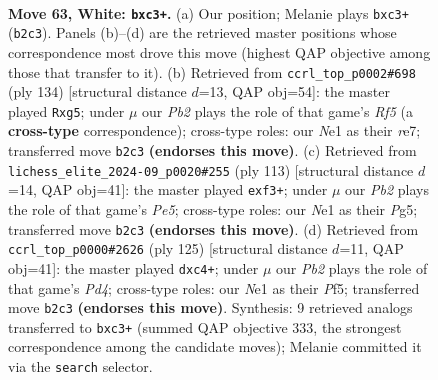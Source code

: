 \documentclass[11pt]{article}
\begin{document}
\clearpage

\begin{figure}[p]\centering
\begin{subfigure}{0.46\textwidth}\centering
\resizebox{\linewidth}{!}{%
\newchessgame
\chessboard[
  setfen={8/8/7R/7P/3k4/2p5/1P3K2/4N3 w - - 0 63},
  showmover=false,
  pgfstyle=straightmove, color=movearrow, markmove={b2-c3}
]}
\caption{}
\end{subfigure}\hfill
\begin{subfigure}{0.46\textwidth}\centering
\resizebox{\linewidth}{!}{%
\newchessgame
\chessboard[
  setfen={8/4r3/7k/5Rp1/3K1P2/8/8/8 w - - 0 68},
  showmover=false,
  pgfstyle=straightmove, color=movearrow, markmove={f5-g5}
]}
\caption{}
\end{subfigure}
\\[4pt]
\begin{subfigure}{0.46\textwidth}\centering
\resizebox{\linewidth}{!}{%
\newchessgame
\chessboard[
  setfen={8/1R6/5p2/6pk/4p3/5P2/6K1/8 b - - 0 57},
  showmover=false,
  pgfstyle=straightmove, color=movearrow, markmove={e4-f3}
]}
\caption{}
\end{subfigure}\hfill
\begin{subfigure}{0.46\textwidth}\centering
\resizebox{\linewidth}{!}{%
\newchessgame
\chessboard[
  setfen={r7/8/6k1/3p1p2/2PP4/1K6/8/7R b - - 2 63},
  showmover=false,
  pgfstyle=straightmove, color=movearrow, markmove={d5-c4}
]}
\caption{}
\end{subfigure}
\caption{\textbf{Move 63, White: \texttt{bxc3+}.} (a) Our position; Melanie plays \texttt{bxc3+} (\texttt{b2c3}). Panels (b)--(d) are the retrieved master positions whose correspondence most drove this move (highest QAP objective among those that transfer to it). (b) Retrieved from \texttt{ccrl\_top\_p0002\#698} (ply 134) [structural distance $d$=13, QAP obj=54]: the master played \texttt{Rxg5}; under $\mu$ our \emph{Pb2} plays the role of that game's \emph{Rf5} (a \textbf{cross-type} correspondence); cross-type roles: our \emph{N}e1 as their \emph{r}e7; transferred move \texttt{b2c3} \textbf{(endorses this move)}. (c) Retrieved from \texttt{lichess\_elite\_2024-09\_p0020\#255} (ply 113) [structural distance $d$=14, QAP obj=41]: the master played \texttt{exf3+}; under $\mu$ our \emph{Pb2} plays the role of that game's \emph{Pe5}; cross-type roles: our \emph{N}e1 as their \emph{P}g5; transferred move \texttt{b2c3} \textbf{(endorses this move)}. (d) Retrieved from \texttt{ccrl\_top\_p0000\#2626} (ply 125) [structural distance $d$=11, QAP obj=41]: the master played \texttt{dxc4+}; under $\mu$ our \emph{Pb2} plays the role of that game's \emph{Pd4}; cross-type roles: our \emph{N}e1 as their \emph{P}f5; transferred move \texttt{b2c3} \textbf{(endorses this move)}. Synthesis: 9 retrieved analogs transferred to \texttt{bxc3+} (summed QAP objective 333, the strongest correspondence among the candidate moves); Melanie committed it via the \texttt{search} selector.}
\label{fig:thought-m124}
\end{figure}
\end{document}
